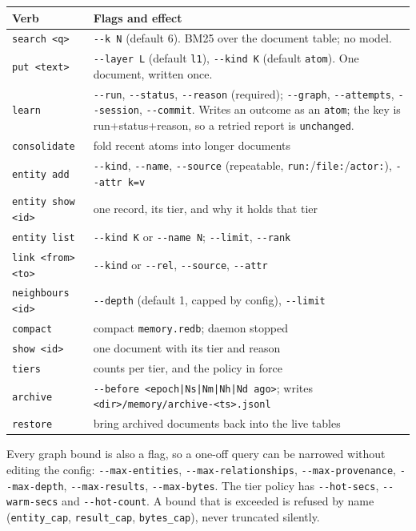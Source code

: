 \begin{longtable}{@{}>{\raggedright\arraybackslash}p{}>{\raggedright\arraybackslash}p{}@{}}
  \toprule
  \textbf{Verb} & \textbf{Flags and effect} \\
  \midrule
  \endhead
  \texttt{search <q>} & \texttt{-{}-k N} (default 6). BM25 over the document table; no model. \\
  \texttt{put <text>} & \texttt{-{}-layer L} (default \texttt{l1}), \texttt{-{}-kind K}
    (default \texttt{atom}). One document, written once. \\
  \texttt{learn} & \texttt{-{}-run}, \texttt{-{}-status}, \texttt{-{}-reason} (required);
    \texttt{-{}-graph}, \texttt{-{}-attempts}, \texttt{-{}-session}, \texttt{-{}-commit}.
    Writes an outcome as an \texttt{atom}; the key is run+status+reason, so a retried report
    is \texttt{unchanged}. \\
  \texttt{consolidate} & fold recent atoms into longer documents \\
  \texttt{entity add} & \texttt{-{}-kind}, \texttt{-{}-name}, \texttt{-{}-source} (repeatable,
    \texttt{run:}/\texttt{file:}/\texttt{actor:}), \texttt{-{}-attr k=v} \\
  \texttt{entity show <id>} & one record, its tier, and why it holds that tier \\
  \texttt{entity list} & \texttt{-{}-kind K} or \texttt{-{}-name N}; \texttt{-{}-limit},
    \texttt{-{}-rank} \\
  \texttt{link <from> <to>} & \texttt{-{}-kind} or \texttt{-{}-rel}, \texttt{-{}-source},
    \texttt{-{}-attr} \\
  \texttt{neighbours <id>} & \texttt{-{}-depth} (default 1, capped by config),
    \texttt{-{}-limit} \\
  \texttt{compact} & compact \texttt{memory.redb}; daemon stopped \\
  \texttt{show <id>} & one document with its tier and reason \\
  \texttt{tiers} & counts per tier, and the policy in force \\
  \texttt{archive} & \texttt{-{}-before <epoch|Ns|Nm|Nh|Nd ago>}; writes
    \texttt{<dir>/memory/archive-<ts>.jsonl} \\
  \texttt{restore} & bring archived documents back into the live tables \\
  \bottomrule
\end{longtable}

Every graph bound is also a flag, so a one-off query can be narrowed without editing the
config: \texttt{-{}-max-entities}, \texttt{-{}-max-relationships}, \texttt{-{}-max-provenance},
\texttt{-{}-max-depth}, \texttt{-{}-max-results}, \texttt{-{}-max-bytes}. The tier policy has
\texttt{-{}-hot-secs}, \texttt{-{}-warm-secs} and \texttt{-{}-hot-count}. A bound that is
exceeded is refused by name (\texttt{entity\_cap}, \texttt{result\_cap}, \texttt{bytes\_cap}),
never truncated silently.

